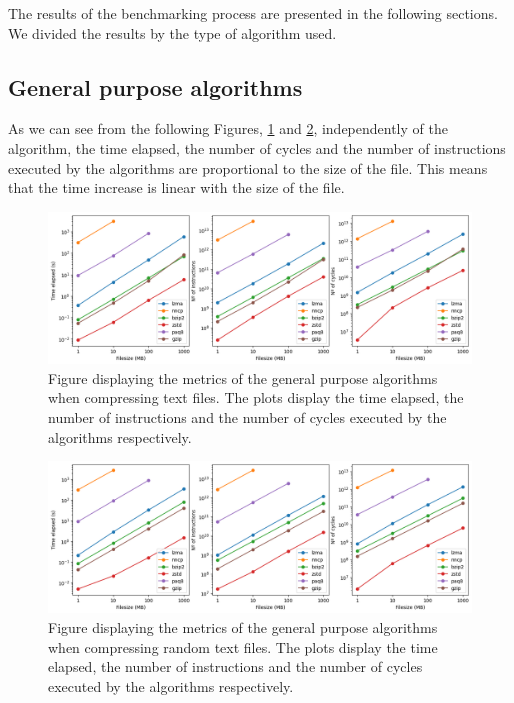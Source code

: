     The results of the benchmarking process are presented in the following sections. We divided the results by the type of algorithm used.

    \subsection{General purpose algorithms}

        As we can see from the following Figures, \ref{fig:text_stats} and \ref{fig:random_text_stats}, independently of the algorithm, the time elapsed, the number of cycles and the number of instructions executed by the algorithms are proportional to the size of the file. This means that the time increase is linear with the size of the file. 

        \begin{figure}[h]
            \centering
            \includegraphics[width=1\textwidth]{figs/text_stats.png}
            \caption[Figure displaying the metrics of the general purpose algorithms when compressing text files.] {Figure displaying the metrics of the general purpose algorithms when compressing text files. The plots display the time elapsed, the number of instructions and the number of cycles executed by the algorithms respectively.}
            \label{fig:text_stats}
        \end{figure}

        \begin{figure}[h]
            \centering
            \includegraphics[width=1\textwidth]{figs/random_text_stats.png}
            \caption[Figure displaying the metrics of the general purpose algorithms when compressing random text files.] {Figure displaying the metrics of the general purpose algorithms when compressing random text files. The plots display the time elapsed, the number of instructions and the number of cycles executed by the algorithms respectively.}
            \label{fig:random_text_stats}
        \end{figure}

